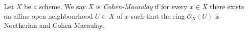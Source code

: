 \begin{definition}
\label{definition-Cohen-Macaulay}
Let $X$ be a scheme. We say $X$ is {\it Cohen-Macaulay} if
for every $x \in X$ there exists an affine open neighbourhood
$U \subset X$ of $x$ such that the ring $\mathcal{O}_X(U)$ is
Noetherian and Cohen-Macaulay.
\end{definition}